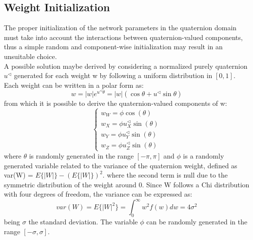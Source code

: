 \documentclass{article}
\begin{document}
    \subsection{Weight Initialization}
    The proper initialization of the network parameters in the quaternion domain must take into account the
    interactions between quaternion-valued components,  thus a simple random and component-wise initialization may result in an 
    unsuitable choice. 
    \\ A possible solution maybe derived by considering a normalized purely quaternion  $u^\triangleleft$ generated for each weight w 
    by following a uniform distribution in $[0,1]$. 
    \\ Each weight can be written in a polar form as:
    \begin{equation*}
        w= |w|e^{u^\triangleleft \theta} = |w| (\cos{\theta} + u^\triangleleft \sin{\theta}) 
    \end{equation*}
    from which it is possible to derive the quaternion-valued components of w:
    \begin{equation*}
        \begin{cases}
            w_W = \phi \cos{(\theta)} \\
            w_X = \phi u_X^\triangleleft\sin{(\theta)} \\
            w_Y = \phi u_Y^\triangleleft\sin{(\theta)} \\
            w_Z = \phi u_Z^\triangleleft\sin{(\theta)}
        \end{cases}
    \end{equation*}
    where $\theta$ is randomly generated in the range $[-\pi, \pi]$ and $\phi$ is a randomly generated variable related to the variance
    of the quaternion weight, defined as var(W) = $E\{|W|\} - (E\{|W|\})^2 $. where  the second term is null due to the symmetric distribution
    of the weight around 0. Since W follows a Chi distribution with four degrees of freedom, the variance can be expressed as:
    \begin{equation*}
        var(W)=E\{|W|^2\}= \int_0^\infty w^2f(w) dw = 4 \sigma^2
    \end{equation*}
    being $\sigma$ the standard deviation. The variable $\phi$ can be randomly generated in the range $[-\sigma, \sigma]$.
\end{document}
